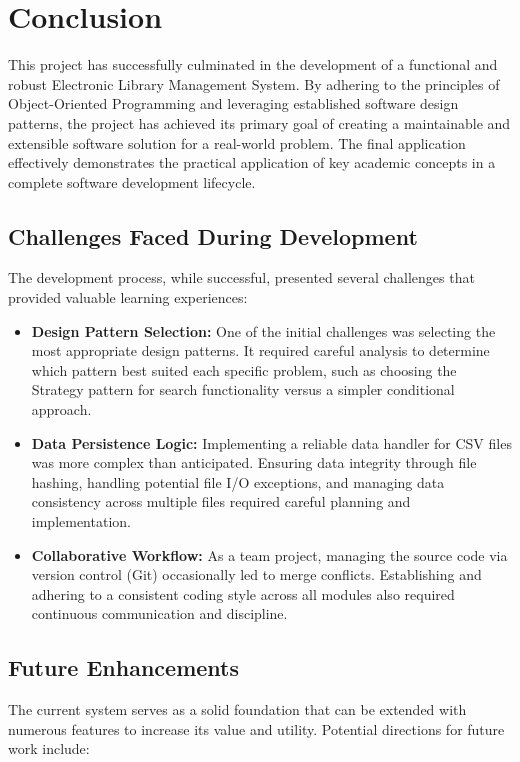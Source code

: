 \section{Conclusion}
\label{sec:conclusion}

This project has successfully culminated in the development of a functional and robust Electronic Library Management System. By adhering to the principles of Object-Oriented Programming and leveraging established software design patterns, the project has achieved its primary goal of creating a maintainable and extensible software solution for a real-world problem. The final application effectively demonstrates the practical application of key academic concepts in a complete software development lifecycle.

\subsection{Challenges Faced During Development}
The development process, while successful, presented several challenges that provided valuable learning experiences:

\begin{itemize}
    \item \textbf{Design Pattern Selection:} One of the initial challenges was selecting the most appropriate design patterns. It required careful analysis to determine which pattern best suited each specific problem, such as choosing the Strategy pattern for search functionality versus a simpler conditional approach.

    \item \textbf{Data Persistence Logic:} Implementing a reliable data handler for CSV files was more complex than anticipated. Ensuring data integrity through file hashing, handling potential file I/O exceptions, and managing data consistency across multiple files required careful planning and implementation.

    \item \textbf{Collaborative Workflow:} As a team project, managing the source code via version control (Git) occasionally led to merge conflicts. Establishing and adhering to a consistent coding style across all modules also required continuous communication and discipline.
\end{itemize}

\subsection{Future Enhancements}
The current system serves as a solid foundation that can be extended with numerous features to increase its value and utility. Potential directions for future work include:

